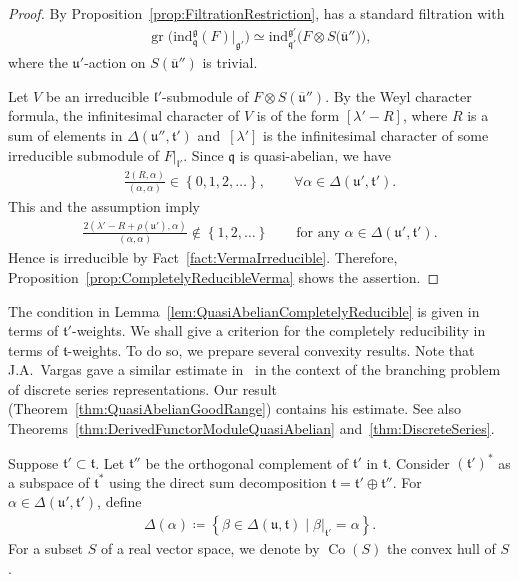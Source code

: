 \documentclass[10pt,a4paper]{amsart}
\numberwithin{equation}{section}
\theoremstyle{definition}
\newcommand{\set}[1]{\left\{#1 \right\}}
\DeclareMathOperator{\gr}{gr}
\newcommand{\lieC}[1]{\mathfrak{#1}}
\newcommand{\lie}[1]{\mathfrak{#1}}
\newcommand{\ind}[2]{\mathrm{ind}^{\lieC{#1}}_{\lieC{#2}}}
\DeclareMathOperator{\Co}{\mathrm{Co}}
\begin{document}
\begin{proof}
	By Proposition~\ref{prop:FiltrationRestriction}, \smash{$\ind{g}{q}(F)|_{\lie{g}'}$} has a standard filtration with
	\begin{align*}
		\gr\bigl(\ind{g}{q}(F)|_{\lie{g}'}\bigr) \simeq \ind{g'}{q'}\bigl(F\otimes S\bigl(\lie{\overline{u}}''\bigr)\bigr),
	\end{align*}
	where the $\lie{u}'$-action on $S(\lie{\overline{u}}'')$ is trivial.

	Let $V$ be an irreducible $\lie{l'}$-submodule of $F\otimes S(\lie{\overline{u}}'')$.
	By the Weyl character formula, the infinitesimal character of $V$ is of the form $[\lambda' - R]$,
	where $R$ is a sum of elements in $\Delta(\lie{u''}, \lie{t'})$ and~$[\lambda']$ is the infinitesimal character of some irreducible submodule of $F|_{\lie{l'}}$.
	Since $\lie{q}$ is quasi-abelian, we have
	\begin{align*}
		\frac{2(R, \alpha)}{(\alpha, \alpha)} \in \set{0, 1, 2, \ldots}, \qquad \forall \alpha \in \Delta(\lie{u'}, \lie{t'}).
	\end{align*}
	This and the assumption imply
	\begin{align*}
		\frac{2(\lambda'-R+\rho(\lie{u}'), \alpha)}{(\alpha, \alpha)} \not \in \set{1, 2, \ldots}\qquad \text{for any }\alpha \in \Delta(\lie{u'}, \lie{t'}).
	\end{align*}
	Hence \smash{$\ind{g'}{q'}(V)$} is irreducible by Fact~\ref{fact:VermaIrreducible}.
	Therefore, Proposition~\ref{prop:CompletelyReducibleVerma} shows the assertion.
\end{proof}

The condition in Lemma~\ref{lem:QuasiAbelianCompletelyReducible} is given in terms of $\lie{t'}$-weights.
We shall give a criterion for the completely reducibility in terms of $\lie{t}$-weights.
To do so, we prepare several convexity results.
Note that J.A.~Vargas gave a similar estimate in~\cite[\S(1.5)]{Va16} in the context of the branching problem of discrete series representations.
Our result (Theorem~\ref{thm:QuasiAbelianGoodRange}) contains his estimate.
See also Theorems~\ref{thm:DerivedFunctorModuleQuasiAbelian} and~\ref{thm:DiscreteSeries}.

Suppose $\lie{t'}\subset \lie{t}$.
Let $\lie{t}''$ be the orthogonal complement of $\lie{t}'$ in $\lie{t}$.
Consider $(\lie{t'})^*$ as a subspace of $\lie{t}^*$
using the direct sum decomposition $\lie{t}=\lie{t'} \oplus \lie{t''}$.
For $\alpha \in \Delta(\lie{u'}, \lie{t'})$, define
\begin{align*}
	\Delta(\alpha)\coloneq \set{\beta \in \Delta(\lie{u}, \lie{t})\mid \beta|_{\lie{t}'}=\alpha}.
\end{align*}
For a subset $S$ of a real vector space, we denote by $\Co(S)$ the convex hull of $S$.
\end{document}
